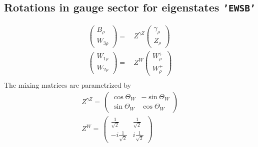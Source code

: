 \subsection{Rotations in gauge sector for eigenstates {\tt 'EWSB'} } 
\begin{align} 
\left(\begin{array}{c} 
B_{{\rho}}\\ 
W_{{3 \rho}}\end{array} \right) 
 = & \,Z^{\gamma Z}
\left(\begin{array}{c} 
\gamma_{{\rho}}\\ 
Z_{{\rho}}\end{array} \right) \\ 
\left(\begin{array}{c} 
W_{{1 \rho}}\\ 
W_{{2 \rho}}\end{array} \right) 
 = & \,Z^{W}
\left(\begin{array}{c} 
W^+_{{\rho}}\\ 
W^+_{{\rho}}\end{array} \right) \\ 
\end{align} 
The mixing matrices are parametrized by \\ 
\begin{align} 
Z^{\gamma Z}= \, \left( 
\begin{array}{cc} 
\cos\Theta_W  & - \sin\Theta_W   \\ 
 \sin\Theta_W  & \cos\Theta_W \end{array} 
\right) \\ 
Z^{W}= \, \left( 
\begin{array}{cc} 
\frac{1}{\sqrt{2}} & \frac{1}{\sqrt{2}} \\ 
 -i \frac{1}{\sqrt{2}}  & i \frac{1}{\sqrt{2}} \end{array} 
\right) \\ 
\end{align} 
